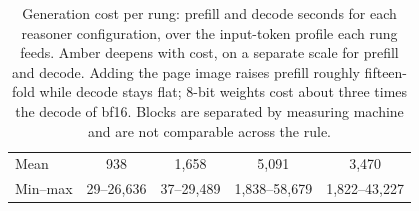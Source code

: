 \begin{table}[t]
{\begin{tabular}{@{} l rr @{\hskip 14pt} rr @{\hskip 14pt} rr @{\hskip 14pt} rr @{}}
Mean     & \multicolumn{2}{c}{938} & \multicolumn{2}{c}{1{,}658} & \multicolumn{2}{c}{5{,}091} & \multicolumn{2}{c}{3{,}470} \\
Min--max & \multicolumn{2}{c}{29--26{,}636} & \multicolumn{2}{c}{37--29{,}489} & \multicolumn{2}{c}{1{,}838--58{,}679} & \multicolumn{2}{c}{1{,}822--43{,}227} \\
\bottomrule
\end{tabular}%
}
\vspace{2pt}
\caption{Generation cost per rung: prefill and decode seconds for each reasoner configuration, over the input-token profile each rung feeds. Amber deepens with cost, on a separate scale for prefill and decode. Adding the page image raises prefill roughly fifteen-fold while decode stays flat; 8-bit weights cost about three times the decode of bf16. Blocks are separated by measuring machine and are not comparable across the rule.}
\label{tab:reasoner_cost}
\end{table}
